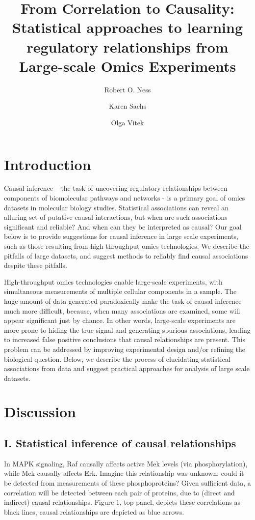 \documentclass[journal=jacsat,manuscript=article]{achemso}
\author{Robert O. Ness}
\affiliation[Purdue University]{Department of Statistics, Purdue University, West Lafayette}
\author{Karen Sachs}
\affiliation[Stanford University]{School of Medicine, Stanford University, Palo Alto}
\author{Olga Vitek}
\affiliation[Northeastern University]{College of Science, College of Computer and Information Science, Northeastern University, Palo Alto}
\title[]
  {From Correlation to Causality: Statistical approaches to learning regulatory relationships from Large-scale Omics Experiments}
\begin{document}
\section{Introduction}
Causal inference -- the task of uncovering regulatory relationships
between components of biomolecular pathways and networks - is a primary
goal of omics datasets in molecular biology studies. Statistical
associations can reveal an alluring set of putative causal interactions,
but when are such associations significant and reliable? And when can
they be interpreted as causal? Our goal below is to provide suggestions
for causal inference in large scale experiments, such as those resulting
from high throughput omics technologies. We describe the pitfalls of
large datasets, and suggest methods to reliably find causal associations
despite these pitfalls.

High-throughput omics technologies enable large-scale experiments, with
simultaneous measurements of multiple cellular components in a sample.
The huge amount of data generated paradoxically make the task of causal
inference much more difficult, because, when many associations are
examined, some will appear significant just by chance. In other words,
large-scale experiments are more prone to hiding the true signal and
generating spurious associations, leading to increased false positive
conclusions that causal relationships are present. This problem can be
addressed by improving experimental design and/or refining the
biological question. Below, we describe the process of elucidating
statistical associations from data and suggest practical approaches for
analysis of large scale datasets.

\section{Discussion}
\subsection{I. Statistical inference of causal relationships}

In MAPK signaling, Raf causally affects active Mek levels (via
phosphorylation), while Mek causally affects Erk. Imagine this
relationship was unknown: could it be detected from measurements of
these phosphoproteins? Given sufficient data, a correlation will be
detected between each pair of proteins, due to (direct and indirect)
causal relationships. Figure 1, top panel, depicts these correlations as
black lines, causal relationships are depicted as blue arrows.
\end{document}
